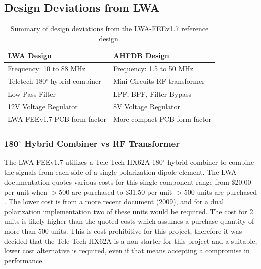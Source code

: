 \subsection{Design Deviations from LWA}
\label{subsec:technical:deviation}

\begin{table}[h!]
\begin{center}
\caption{Summary of design deviations from the LWA-FEEv1.7 reference design.}
\label{table:lwa_differences}
\begin{tabular}{|l|l|}
	\hline
	\textbf{LWA Design} & \textbf{AHFDB Design} \\
	\hline
	Frequency: 10 to 88 MHz & Frequency: 1.5 to 50 MHz\\
	\hline
	Teletech 180$^{\circ}$ hybrid combiner & Mini-Circuits RF transformer\\
	\hline
	Low Pass Filter & LPF, BPF, Filter Bypass\\
	\hline
	12V Voltage Regulator & 8V Voltage Regulator \\
	\hline
	LWA-FEEv1.7 PCB form factor & More compact PCB form factor\\
	\hline
\end{tabular}
\end{center}
\end{table}

\subsubsection{180$^{\circ}$ Hybrid Combiner vs RF Transformer}
\label{subsubsec:technical:deviation:hybrid}
The LWA-FEEv1.7 utilizes a Tele-Tech HX62A 180$^{\circ}$ hybrid combiner to combine the signals from each side of a single polarization dipole element.
The LWA documentation quotes various costs for this single component range from \$20.00 per unit when $>$500 are purchased \cite{lwa_memo_188} to \$31.50 per unit $>$500 units are purchased \cite{lwa_memo_190}.
The lower cost is from a more recent document (2009), and for a dual polarization implementation two of these units would be required.
The cost for 2 units is likely higher than the quoted costs which assumes a purchase quantity of more than 500 units.
This is cost prohibitive for this project, therefore it was decided that the Tele-Tech HX62A is a non-starter for this project and a suitable, lower cost alternative is required, even if that means accepting a compromise in performance.

